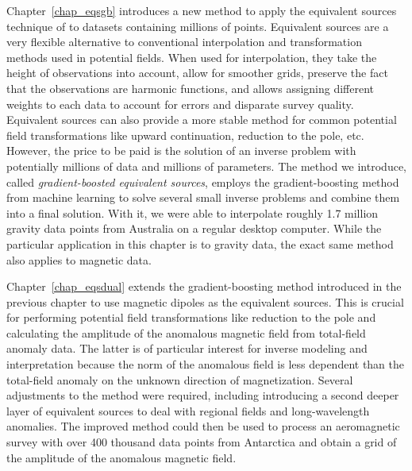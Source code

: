 \documentclass[10pt,a4paper,oneside]{book}
\begin{document}
Chapter~\ref{chap_eqsgb} introduces a new method to apply the equivalent
sources technique of \citet{cordell1992} to datasets containing millions of
points.
Equivalent sources are a very flexible alternative to conventional
interpolation and transformation methods used in potential fields.
When used for interpolation, they take the height of observations into account,
allow for smoother grids, preserve the fact that the observations are harmonic
functions, and allows assigning different weights to each data to account for
errors and disparate survey quality.
Equivalent sources can also provide a more stable method for common potential
field transformations like upward continuation, reduction to the pole, etc.
However, the price to be paid is the solution of an inverse problem with
potentially millions of data and millions of parameters.
The method we introduce, called \textit{gradient-boosted equivalent sources},
employs the gradient-boosting method from machine learning to solve several
small inverse problems and combine them into a final solution.
With it, we were able to interpolate roughly 1.7 million gravity data points
from Australia on a regular desktop computer.
While the particular application in this chapter is to gravity data, the exact
same method also applies to magnetic data.

Chapter~\ref{chap_eqsdual} extends the gradient-boosting method introduced in
the previous chapter to use magnetic dipoles as the equivalent sources.
This is crucial for performing potential field transformations like reduction
to the pole and calculating the amplitude of the anomalous magnetic field from
total-field anomaly data.
The latter is of particular interest for inverse modeling and interpretation
because the norm of the anomalous field is less dependent than the total-field
anomaly on the unknown direction of magnetization.
Several adjustments to the method were required, including introducing a second
deeper layer of equivalent sources to deal with regional fields and
long-wavelength anomalies.
The improved method could then be used to process an aeromagnetic survey with
over 400 thousand data points from Antarctica and obtain a grid of the
amplitude of the anomalous magnetic field.
\end{document}
